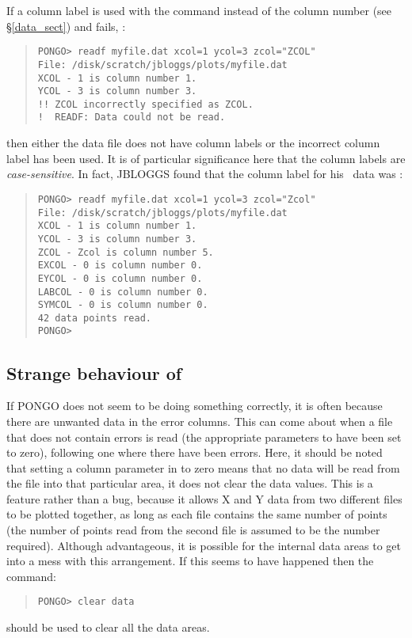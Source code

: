 If a column label is used with the  command instead
of the column number (see \S\ref{data_sect}) and 
fails, \eg:
\begin{quote}
\begin{verbatim}
PONGO> readf myfile.dat xcol=1 ycol=3 zcol="ZCOL"
File: /disk/scratch/jbloggs/plots/myfile.dat
XCOL - 1 is column number 1.
YCOL - 3 is column number 3.
!! ZCOL incorrectly specified as ZCOL.
!  READF: Data could not be read.
\end{verbatim}
\end{quote}
then either the data file does not have column labels or the incorrect
column label has been used.
It is of particular significance here that the column labels are {\em
case-sensitive}.
In fact, JBLOGGS found that the column label for his \zcol\ data was
:
\begin{quote}
\begin{verbatim}
PONGO> readf myfile.dat xcol=1 ycol=3 zcol="Zcol"
File: /disk/scratch/jbloggs/plots/myfile.dat
XCOL - 1 is column number 1.
YCOL - 3 is column number 3.
ZCOL - Zcol is column number 5.
EXCOL - 0 is column number 0.
EYCOL - 0 is column number 0.
LABCOL - 0 is column number 0.
SYMCOL - 0 is column number 0.
42 data points read.
PONGO>
\end{verbatim}
\end{quote}


\subsection{Strange behaviour of }

If PONGO does not seem to be doing something correctly, it is often
because there are unwanted data in the error columns.  This can come
about when a file that does not contain errors is read (the
appropriate parameters to  have been set to zero),
following one where there have been errors.
Here, it should be noted that setting a column parameter in
 to zero means that no data will be read from the
file into that particular area, it does not clear the data values.
This is a feature rather than a bug, because it allows X and Y data from two
different files to be plotted together, as long as each file contains the same
number of points (the number of points read from the second file is
assumed to be the number required).
Although advantageous, it is possible for the internal data areas to get into a
mess with this arrangement.
If this seems to have happened then the command:
\begin{quote}
\begin{verbatim}
PONGO> clear data
\end{verbatim}
\end{quote}
should be used to clear all the data areas.


